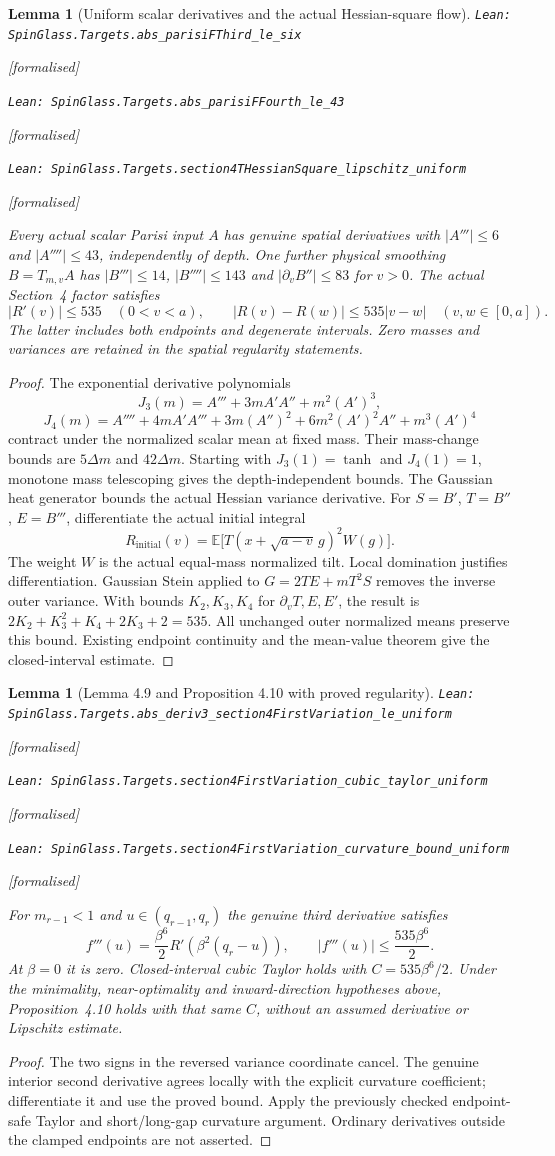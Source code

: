 \documentclass[11pt]{article}
\providecommand{\lean}[1]{\leavevmode\par\nopagebreak
  {\noindent\normalfont\footnotesize\raggedright\texttt{Lean: #1}\par}\nopagebreak}
\providecommand{\leanok}{\par\nopagebreak
  {\noindent\normalfont\footnotesize\textcolor{green!50!black}{[formalised]}\par}\nopagebreak}
\newtheorem{lemma}[theorem]{Lemma}
\begin{document}
\begin{lemma}[Uniform scalar derivatives and the actual Hessian-square flow]
\lean{SpinGlass.Targets.abs\_parisiFThird\_le\_six}\leanok
\lean{SpinGlass.Targets.abs\_parisiFFourth\_le\_43}\leanok
\lean{SpinGlass.Targets.section4THessianSquare\_lipschitz\_uniform}\leanok
Every actual scalar Parisi input $A$ has genuine spatial derivatives with
$|A'''|\le6$ and $|A''''|\le43$, independently of depth. One further physical
smoothing $B=T_{m,v}A$ has $|B'''|\le14$, $|B''''|\le143$ and
$|\partial_v B''|\le83$ for $v>0$. The actual Section~4 factor satisfies
\[
 |R'(v)|\le535\quad(0<v<a),\qquad
 |R(v)-R(w)|\le535|v-w|\quad(v,w\in[0,a]).
\]
The latter includes both endpoints and degenerate intervals. Zero masses
and variances are retained in the spatial regularity statements.
\end{lemma}
\begin{proof}
The exponential derivative polynomials
\[
 J_3(m)=A'''+3mA'A''+m^2(A')^3,
\]
\[
 J_4(m)=A''''+4mA'A'''+3m(A'')^2+6m^2(A')^2A''+m^3(A')^4
\]
contract under the normalized scalar mean at fixed mass. Their mass-change
bounds are $5\Delta m$ and $42\Delta m$. Starting with $J_3(1)=\tanh$
and $J_4(1)=1$, monotone mass telescoping gives the depth-independent bounds.
The Gaussian heat generator bounds the actual Hessian variance derivative.
For $S=B'$, $T=B''$, $E=B'''$, differentiate the actual initial integral
\[
 R_{\mathrm{initial}}(v)=\mathbb E\bigl[T(x+\sqrt{a-v}\,g)^2W(g)\bigr].
\]
The weight $W$ is the actual equal-mass normalized tilt. Local domination
justifies differentiation. Gaussian Stein applied to
$G=2TE+mT^2S$ removes the inverse outer variance. With bounds $K_2,K_3,K_4$
for $\partial_vT,E,E'$, the result is
$2K_2+K_3^2+K_4+2K_3+2=535$.
All unchanged outer normalized means preserve this bound. Existing endpoint
continuity and the mean-value theorem give the closed-interval estimate.
\end{proof}

\begin{lemma}[Lemma 4.9 and Proposition 4.10 with proved regularity]
\lean{SpinGlass.Targets.abs\_deriv3\_section4FirstVariation\_le\_uniform}\leanok
\lean{SpinGlass.Targets.section4FirstVariation\_cubic\_taylor\_uniform}\leanok
\lean{SpinGlass.Targets.section4FirstVariation\_curvature\_bound\_uniform}\leanok
For $m_{r-1}<1$ and $u\in(q_{r-1},q_r)$ the genuine third derivative satisfies
\[
 f'''(u)=\frac{\beta^6}{2}R'(\beta^2(q_r-u)),\qquad
 |f'''(u)|\le\frac{535\beta^6}{2}.
\]
At $\beta=0$ it is zero. Closed-interval cubic Taylor holds with
$C=535\beta^6/2$. Under the minimality, near-optimality and inward-direction
hypotheses above, Proposition~4.10 holds with that same $C$, without an
assumed derivative or Lipschitz estimate.
\end{lemma}
\begin{proof}
The two signs in the reversed variance coordinate cancel. The genuine
interior second derivative agrees locally with the explicit curvature
coefficient; differentiate it and use the proved bound. Apply the previously
checked endpoint-safe Taylor and short/long-gap curvature argument.
Ordinary derivatives outside the clamped endpoints are not asserted.
\end{proof}
\end{document}
